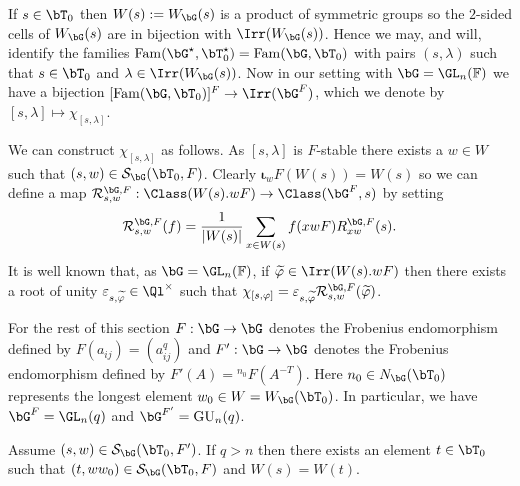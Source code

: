 \documentclass[eqthmnum,nocolour,skinny]{jt-calcs}
\DeclareMathOperator{\Fam}{Fam}
\newcommand{\GU}{\ensuremath{\mathrm{GU}}}
\begin{document}
\begin{pa}
If $s \in \bT_0$ then $W(s) := W_{\bG}(s)$ is a product of symmetric groups so the $2$-sided cells of $W_{\bG}(s)$ are in bijection with $\Irr(W_{\bG}(s))$. Hence we may, and will, identify the families $\Fam(\bG^{\star},\bT_0^{\star}) = \Fam(\bG,\bT_0)$ with pairs $(s,\lambda)$ such that $s \in \bT_0$ and $\lambda \in \Irr(W_{\bG}(s))$. Now in our setting with $\bG = \GL_n(\mathbb{F})$ we have a bijection $[\Fam(\bG,\bT_0)]^F \to \Irr(\bG^F)$, which we denote by $[s,\lambda] \mapsto \chi_{[s,\lambda]}$.
\end{pa}

\begin{pa}
We can construct $\chi_{[s,\lambda]}$ as follows. As $[s,\lambda]$ is $F$-stable there exists a $w \in W$ such that $(s,w) \in \mathcal{S}_{\bG}(\bT_0,F)$. Clearly $\boldsymbol{\iota}_wF(W(s)) = W(s)$ so we can define a map $\mathcal{R}_{s,w}^{\bG,F} : \Class(W(s).wF) \to \Class(\bG^F, s)$ by setting
\begin{equation*}
\mathcal{R}_{s,w}^{\bG,F}(f) = \frac{1}{|W(s)|}\sum_{x \in W(s)} f(xwF)R_{xw}^{\bG,F}(s).
\end{equation*}
It is well known that, as $\bG = \GL_n(\mathbb{F})$, if $\widetilde{\varphi} \in \Irr(W(s).wF)$ then there exists a root of unity $\varepsilon_{s,\widetilde{\varphi}} \in \Ql^{\times}$ such that $\chi_{[s,\varphi]} = \varepsilon_{s,\widetilde{\varphi}}\mathcal{R}_{s,w}^{\bG,F}(\widetilde{\varphi})$.
\end{pa}

\begin{pa}
For the rest of this section $F : \bG \to \bG$ denotes the Frobenius endomorphism defined by $F(a_{ij}) = (a_{ij}^q)$ and $F' : \bG \to \bG$ denotes the Frobenius endomorphism defined by $F'(A) = {}^{n_0}F(A^{-T})$. Here $n_0 \in N_{\bG}(\bT_0)$ represents the longest element $w_0 \in W = W_{\bG}(\bT_0)$. In particular, we have $\bG^F = \GL_n(q)$ and $\bG^{F'} = \GU_n(q)$.
\end{pa}

\begin{lem}\label{lem:ennola-duality-ss-classes}
Assume $(s,w) \in \mathcal{S}_{\bG}(\bT_0,F')$. If $q > n$ then there exists an element $t \in \bT_0$ such that $(t,ww_0) \in \mathcal{S}_{\bG}(\bT_0,F)$ and $W(s) = W(t)$.
\end{lem}
\end{document}
